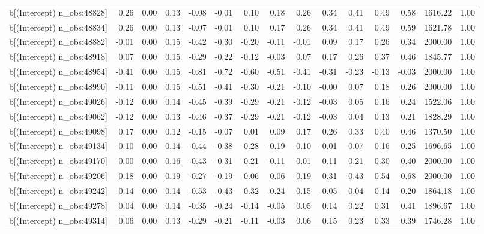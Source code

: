 \begin{table}[ht]
\begin{tabular}{rrrrrrrrrrrrrrr}
  b[(Intercept) n\_obs:48828] & 0.26 & 0.00 & 0.13 & -0.08 & -0.01 & 0.10 & 0.18 & 0.26 & 0.34 & 0.41 & 0.49 & 0.58 & 1616.22 & 1.00 \\ 
  b[(Intercept) n\_obs:48834] & 0.26 & 0.00 & 0.13 & -0.07 & -0.01 & 0.10 & 0.17 & 0.26 & 0.34 & 0.41 & 0.49 & 0.59 & 1621.78 & 1.00 \\ 
  b[(Intercept) n\_obs:48882] & -0.01 & 0.00 & 0.15 & -0.42 & -0.30 & -0.20 & -0.11 & -0.01 & 0.09 & 0.17 & 0.26 & 0.34 & 2000.00 & 1.00 \\ 
  b[(Intercept) n\_obs:48918] & 0.07 & 0.00 & 0.15 & -0.29 & -0.22 & -0.12 & -0.03 & 0.07 & 0.17 & 0.26 & 0.37 & 0.46 & 1845.77 & 1.00 \\ 
  b[(Intercept) n\_obs:48954] & -0.41 & 0.00 & 0.15 & -0.81 & -0.72 & -0.60 & -0.51 & -0.41 & -0.31 & -0.23 & -0.13 & -0.03 & 2000.00 & 1.00 \\ 
  b[(Intercept) n\_obs:48990] & -0.11 & 0.00 & 0.15 & -0.51 & -0.41 & -0.30 & -0.21 & -0.10 & -0.00 & 0.07 & 0.18 & 0.26 & 2000.00 & 1.00 \\ 
  b[(Intercept) n\_obs:49026] & -0.12 & 0.00 & 0.14 & -0.45 & -0.39 & -0.29 & -0.21 & -0.12 & -0.03 & 0.05 & 0.16 & 0.24 & 1522.06 & 1.00 \\ 
  b[(Intercept) n\_obs:49062] & -0.12 & 0.00 & 0.13 & -0.46 & -0.37 & -0.29 & -0.21 & -0.12 & -0.03 & 0.04 & 0.13 & 0.21 & 1828.29 & 1.00 \\ 
  b[(Intercept) n\_obs:49098] & 0.17 & 0.00 & 0.12 & -0.15 & -0.07 & 0.01 & 0.09 & 0.17 & 0.26 & 0.33 & 0.40 & 0.46 & 1370.50 & 1.00 \\ 
  b[(Intercept) n\_obs:49134] & -0.10 & 0.00 & 0.14 & -0.44 & -0.38 & -0.28 & -0.19 & -0.10 & -0.01 & 0.07 & 0.16 & 0.25 & 1696.65 & 1.00 \\ 
  b[(Intercept) n\_obs:49170] & -0.00 & 0.00 & 0.16 & -0.43 & -0.31 & -0.21 & -0.11 & -0.01 & 0.11 & 0.21 & 0.30 & 0.40 & 2000.00 & 1.00 \\ 
  b[(Intercept) n\_obs:49206] & 0.18 & 0.00 & 0.19 & -0.27 & -0.19 & -0.06 & 0.06 & 0.19 & 0.31 & 0.43 & 0.54 & 0.68 & 2000.00 & 1.00 \\ 
  b[(Intercept) n\_obs:49242] & -0.14 & 0.00 & 0.14 & -0.53 & -0.43 & -0.32 & -0.24 & -0.15 & -0.05 & 0.04 & 0.14 & 0.20 & 1864.18 & 1.00 \\ 
  b[(Intercept) n\_obs:49278] & 0.04 & 0.00 & 0.14 & -0.35 & -0.24 & -0.14 & -0.05 & 0.05 & 0.14 & 0.22 & 0.31 & 0.41 & 1896.67 & 1.00 \\ 
  b[(Intercept) n\_obs:49314] & 0.06 & 0.00 & 0.13 & -0.29 & -0.21 & -0.11 & -0.03 & 0.06 & 0.15 & 0.23 & 0.33 & 0.39 & 1746.28 & 1.00 \\ 

\end{tabular}
\end{table}
